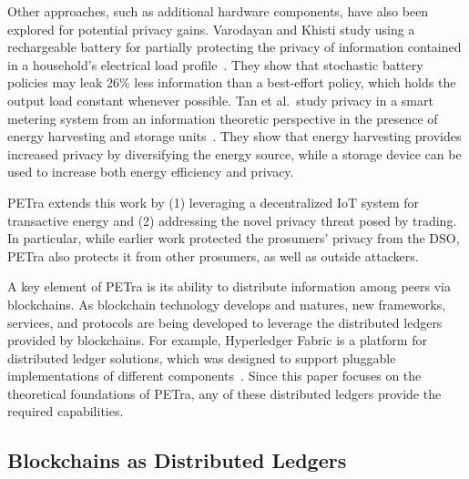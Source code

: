 Other approaches, such as additional hardware components, have also been explored 
for potential privacy gains. 
Varodayan and Khisti study using a
rechargeable battery for partially protecting the privacy of
information contained in a household's electrical load
profile~\cite{varodayan2011smart}. They show that stochastic battery
policies may leak 26\% less information than a best-effort policy,
which holds the output load constant whenever possible. Tan et
al.\ study privacy in a smart metering system from an information
theoretic perspective in the presence of energy harvesting and storage
units~\cite{tan2013increasing}. They show that energy harvesting
provides increased privacy by diversifying the energy source, while a
storage device can be used to increase both energy efficiency and
privacy.

PETra extends this work by (1) leveraging a decentralized IoT
system for transactive energy and (2) addressing the novel privacy
threat posed by trading. In particular, while earlier work protected
the prosumers' privacy from the DSO, PETra also protects it from other
prosumers, as well as outside attackers.

A key element of PETra is its ability to distribute information among
peers via blockchains.  As blockchain technology develops and matures,
new frameworks, services, and protocols are being developed to
leverage the distributed ledgers provided by blockchains. For example,
Hyperledger Fabric is a platform for distributed ledger solutions,
which was designed to support pluggable implementations of different
components~\cite{hyperledger2017fabric}.
Since this paper focuses on the theoretical foundations of PETra, any
of these distributed ledgers provide the required capabilities.


\iffalse
\subsection{Blockchains as Distributed Ledgers}

